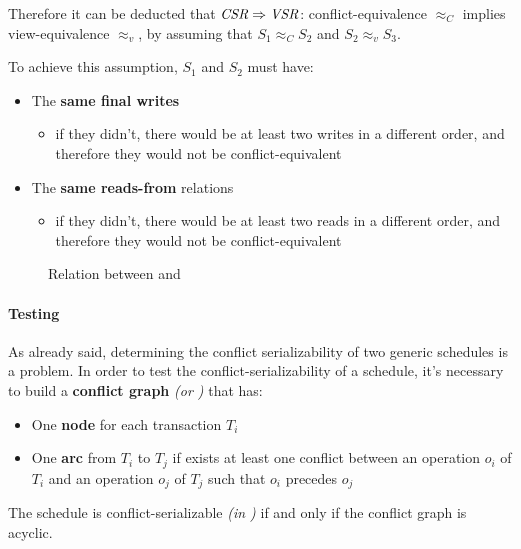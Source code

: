 \documentclass[english]{article}
\begin{document}
\bigskip
Therefore it can be deducted that \(\textit{CSR} \Rightarrow \textit{VSR}\): conflict-equivalence \(\approx_C\) implies view-equivalence \(\approx_v\), by assuming that \(S_1 \approx_C S_2\) and \(S_2 \approx_v S_3\).

To achieve this assumption, \(S_1\) and \(S_2\) must have:

\begin{itemize}
  \item The \textbf{same final writes}
        \begin{itemize}
          \item if they didn't, there would be at least two writes in a different order, and therefore they would not be conflict-equivalent
        \end{itemize}
  \item The \textbf{same reads-from} relations
        \begin{itemize}
          \item if they didn't, there would be at least two reads in a different order, and therefore they would not be conflict-equivalent
        \end{itemize}
\end{itemize}

\begin{figure}[htbp]
  \bigskip
  \centering
  \caption{Relation between \VSR and \CSR}
  \label{fig:relation-between-vsr-and-csr}
  \bigskip
\end{figure}

\paragraph{Testing \CSR}

As already said, determining the conflict serializability of two generic schedules is a \NPC problem.
In order to test the conflict-serializability of a schedule, it's necessary to build a \textbf{conflict graph} \textit{(or \CG)} that has:

\begin{itemize}
  \item One \textbf{node} for each transaction \(T_i\)
  \item One \textbf{arc} from \(T_i\) to \(T_j\) if exists at least one conflict between an operation \(o_i\) of \(T_i\) and an operation \(o_j\) of \(T_j\) such that \(o_i\) precedes \(o_j\)
\end{itemize}

The schedule is conflict-serializable \textit{(in \CSR)} if and only if the conflict graph is acyclic.
\end{document}
